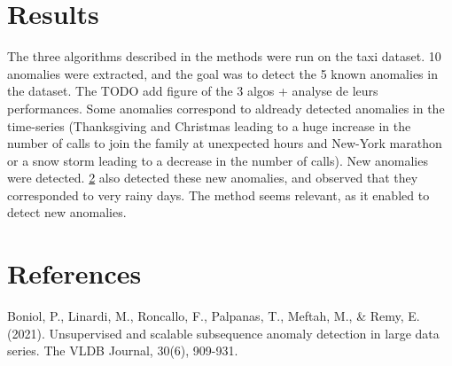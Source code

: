 \documentclass[11pt]{article}
\begin{document}

\section{Results}
The three algorithms described in the methods were run on the taxi dataset. 
10 anomalies were extracted, and the goal was to detect the 5 known anomalies in the dataset. 
The 
TODO add figure of the 3 algos + analyse de leurs performances.
Some anomalies correspond to aldready detected anomalies in the time-series (Thanksgiving and Christmas leading to a huge increase in the number of calls to join the family at unexpected hours and New-York marathon or a snow storm leading to a decrease in the number of calls). 
New anomalies were detected. 
\ref{ref1} also detected these new anomalies, and observed that they corresponded to very rainy days. 
The method seems relevant, as it enabled to detect new anomalies. 





\section{References}
\label{ref1} Boniol, P., Linardi, M., Roncallo, F., Palpanas, T., Meftah, M., \& Remy, E. (2021). Unsupervised and scalable subsequence anomaly detection in large data series. The VLDB Journal, 30(6), 909-931.
\end{document}
